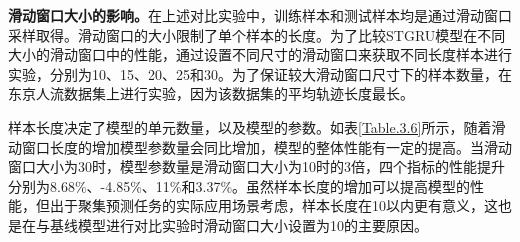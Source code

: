 \documentclass[master]{thesis-uestc}
\begin{document}
\textbf{滑动窗口大小的影响。}在上述对比实验中，训练样本和测试样本均是通过滑动窗口采样取得。滑动窗口的大小限制了单个样本的长度。为了比较STGRU模型在不同大小的滑动窗口中的性能，通过设置不同尺寸的滑动窗口来获取不同长度样本进行实验，分别为10、15、20、25和30。为了保证较大滑动窗口尺寸下的样本数量，在东京人流数据集上进行实验，因为该数据集的平均轨迹长度最长。
\begin{table}[ht]
\centering
\caption{不同长度滑动窗口对模型性能的影响}
\label{Table.3.6}
\end{table}

样本长度决定了模型的单元数量，以及模型的参数。如表\ref{Table.3.6}所示，随着滑动窗口长度的增加模型参数量会同比增加，模型的整体性能有一定的提高。当滑动窗口大小为30时，模型参数量是滑动窗口大小为10时的3倍，四个指标的性能提升分别为8.68$\%$、-4.85$\%$、11$\%$和3.37$\%$。虽然样本长度的增加可以提高模型的性能，但出于聚集预测任务的实际应用场景考虑，样本长度在10以内更有意义，这也是在与基线模型进行对比实验时滑动窗口大小设置为10的主要原因。
\end{document}
